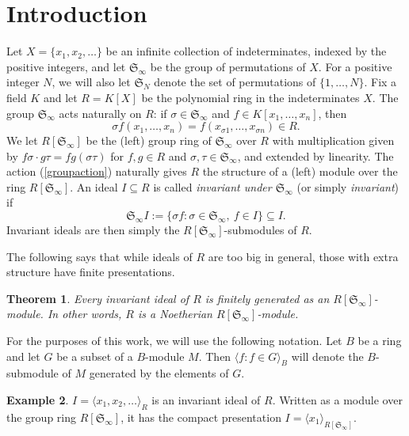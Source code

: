 \documentclass{amsart}
\newtheorem{theorem}{Theorem}[section]
\theoremstyle{definition}
\newtheorem{example}[theorem]{Example}
\theoremstyle{remark}
\numberwithin{equation}{section}
\newcommand{\<}{\langle}
\renewcommand{\>}{\rangle}
\begin{document}
\section{Introduction}
Let $X = \{x_1,x_2,\ldots\}$ be an infinite collection of
indeterminates, indexed by the positive integers, and let ${\mathfrak S}_{\infty}$ be the group of
permutations of $X$.  For a positive integer $N$, we will also let 
${\mathfrak S}_N$ denote the set of permutations of $\{1,\ldots,N\}$.
Fix a field $K$ and let $R = K[X]$ be the polynomial ring in the indeterminates $X$.  The group
${\mathfrak S}_{\infty}$ acts naturally on $R$: if $\sigma \in {\mathfrak
  S}_{\infty}$ and $f\in K[x_1,\dots,x_n]$, then 
\begin{equation}\label{groupaction}
\sigma f(x_1,\ldots,x_n) = f( x_{\sigma1},\dots,  x_{\sigma n})\in R.
\end{equation}
We let $R[{\mathfrak S}_{\infty}]$ be the (left) group ring of ${\mathfrak S}_{\infty}$ over $R$ 
with multiplication given by $f\sigma\cdot g\tau = fg(\sigma\tau)$ for $f,g\in R$ and
$\sigma,\tau\in {\mathfrak S}_{\infty}$, and extended by linearity.
The action (\ref{groupaction}) naturally gives $R$ the structure of a (left) module over the
ring $R[{\mathfrak S}_{\infty}]$.
An ideal $I \subseteq R$ is called \textit{invariant under ${\mathfrak S}_{\infty}$}
(or simply \textit{invariant}) if \[ {\mathfrak S}_{\infty}I := \{\sigma f
: \sigma \in {\mathfrak S}_{\infty}, \ f \in I\} \subseteq I.\] 
Invariant ideals are then simply the $R[{\mathfrak S}_{\infty}]$-submodules of
$R$.  

The following says that while ideals of $R$
are too big in general, those with extra structure have finite presentations.

\begin{theorem}\label{onevarfinitegenthm}
Every invariant ideal of $R$ is finitely generated as an $R[ {\mathfrak S}_{\infty}]$-module.  
In other words, $R$ is a Noetherian $R[{\mathfrak S}_{\infty}]$-module.
\end{theorem}


For the purposes of this work, we will use the following notation.
Let $B$ be a ring and let $G$ be a subset of a $B$-module $M$.  Then
$\<f: f \in G \>_{B}$ will denote the $B$-submodule of $M$ generated
by the elements of $G$.


\begin{example}
$I = \<x_1,x_2,\ldots\>_R$ is an invariant ideal of $R$.  Written as 
a module over the group ring $R[{\mathfrak S}_{\infty}]$, it has the
compact presentation $I= \<x_1\>_{R[{\mathfrak S}_{\infty}]}$.
\end{example}
\end{document}
